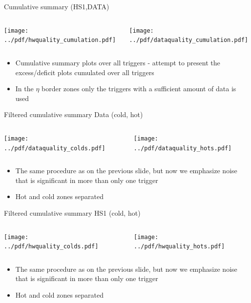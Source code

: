 \documentclass[9pt]{beamer}
\begin{document}
\begin{frame}[t]{Cumulative summary (HS1,DATA)}
\begin{columns}[T]
  \begin{column}{.5\textwidth}
  \texttt{[image: ../pdf/hwquality\_cumulation.pdf]}
  \end{column}
  \begin{column}{.5\textwidth}
  \texttt{[image: ../pdf/dataquality\_cumulation.pdf]}
  \end{column}
\end{columns}
\begin{itemize}
 \item Cumulative summary plots over all triggers - attempt to present the excess/deficit plots cumulated over all triggers
 \item In the $\eta$ border zones only the triggers with a sufficient amount of data is used
\end{itemize}
\end{frame}

\begin{frame}[t]{Filtered cumulative summary Data (cold, hot)}
\begin{columns}[T]
  \begin{column}{.5\textwidth}
  \texttt{[image: ../pdf/dataquality\_colds.pdf]}
  \end{column}
  \begin{column}{.5\textwidth}
  \texttt{[image: ../pdf/dataquality\_hots.pdf]}
  \end{column}
\end{columns}
\begin{itemize}
 \item The same procedure as on the previous slide, but now we emphasize noise that is significant in more than only one trigger
 \item Hot and cold zones separated
\end{itemize}
\end{frame}

\begin{frame}[t]{Filtered cumulative summary HS1 (cold, hot)}
\begin{columns}[T]
  \begin{column}{.5\textwidth}
  \texttt{[image: ../pdf/hwquality\_colds.pdf]}
  \end{column}
  \begin{column}{.5\textwidth}
  \texttt{[image: ../pdf/hwquality\_hots.pdf]}
  \end{column}
\end{columns}
\begin{itemize}
 \item The same procedure as on the previous slide, but now we emphasize noise that is significant in more than only one trigger
 \item Hot and cold zones separated
\end{itemize}
\end{frame}
\end{document}
